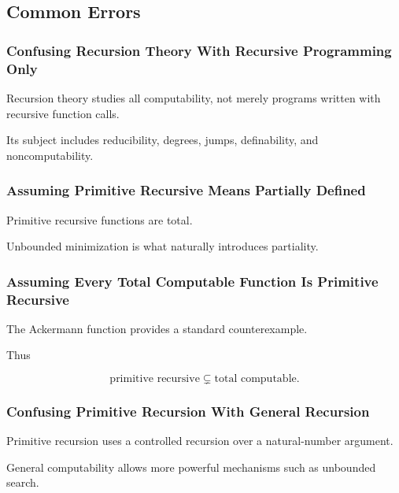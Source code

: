 \subsection{Common Errors}
\label{subsec:recursion-theory-common-errors}

\subsubsection{Confusing Recursion Theory With Recursive Programming Only}

Recursion theory studies all computability, not merely programs written
with recursive function calls.

Its subject includes reducibility, degrees, jumps, definability, and
noncomputability.

\subsubsection{Assuming Primitive Recursive Means Partially Defined}

Primitive recursive functions are total.

Unbounded minimization is what naturally introduces partiality.

\subsubsection{Assuming Every Total Computable Function Is Primitive Recursive}

The Ackermann function provides a standard counterexample.

Thus

\[
\boxed{
\text{primitive recursive}
\subsetneq
\text{total computable}.
}
\]

\subsubsection{Confusing Primitive Recursion With General Recursion}

Primitive recursion uses a controlled recursion over a natural-number
argument.

General computability allows more powerful mechanisms such as unbounded
search.

